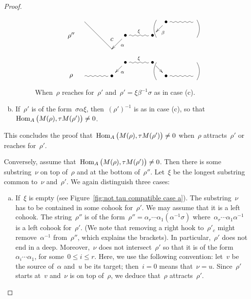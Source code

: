 \documentclass{amsart}
\theoremstyle{definition}
\newcommand{\Hom}[1]{\operatorname{{\rm Hom}}_{#1}}
\begin{document}
\begin{proof}
\begin{enumerate}[(a)]
 \begin{figure}[h]
 	\capstart
\[
\xy
%
(-35,7)*+{\rho''};
(-28,14)="peak";
(-14,5)*+{c};
(-14,0)="-12";
(-7,7)*+{\bullet}="-11";
(7,7)*+{\bullet}="11";
(14,14)*+{\bullet}="12";
(28,14)="14";
%
(-35,-14)*+{\rho};
(-28,-14)="-4";
(-14,-14)*+{\bullet}="-2";
(-7,-7)*+{\bullet}="-1";
(7,-7)*+{\bullet}="1";
(14,-14)*+{\bullet}="2";
(28,-14)="4";
%
{\ar@{-} "peak";"-12"};
{\ar^{\alpha} "-11";"-12"};
{\ar@{~}^\xi "-11";"11"};
{\ar^{\beta} "12";"11"};
{\ar@{~} "12";"14"};
%
{\ar@/^.3pc/@{-} (30,15);(30,6)};
{\ar@/_.3pc/@{-} (9,15);(9,6)};
%
{\ar@/_.3pc/@{-} (30,-16);(30,-7)};
{\ar@/^.3pc/@{-} (9,-16);(9,-7)};
%
{\ar@{~} "-4";"-2"};
{\ar^{\alpha} "-1";"-2"};
{\ar@{~}^\xi "-1";"1"};
{\ar "1";"2"};
{\ar@{~} "2";"4"};
%
\endxy
\]
    \caption{When~$\rho$ reaches for~$\rho'$ and~$\rho'=\xi\beta^{-1}\sigma$ as in case (c).}
    \vspace{-.5cm}
    \label{fig:dance case c}
\end{figure}

\item If~$\rho'$ is of the form~$\sigma\alpha\xi$, then~$(\rho')^{-1}$ is as in case (c), so that~$\Hom{A} \big( M(\rho), \tau M(\rho') \big) \ne 0$.
\end{enumerate}
This concludes the proof that~$\Hom{A} \big( M(\rho), \tau M(\rho') \big) \ne 0$ when~$\rho$ attracts~$\rho'$ or reaches for~$\rho'$.

\bigskip
Conversely, assume that~$\Hom{A} \big( M(\rho), \tau M(\rho') \big) \ne 0$.
Then there is some substring~$\nu$ on top of~$\rho$ and at the bottom of~$\rho''$.
Let~$\xi$ be the longest substring common to~$\nu$ and~$\rho'$.
We again distinguish three cases:

\begin{enumerate}[(a)]
\item If~$\xi$ is empty (see Figure~\ref{fig:not tau compatible case a}).
The substring~$\nu$ has to be contained in some cohook for~$\rho'$.
We may assume that it is a left cohook.
The string~$\rho''$ is of the form~$\rho''= \alpha_r\cdots\alpha_1(\alpha^{-1}\sigma)$ where~$\alpha_r\cdots\alpha_1\alpha^{-1}$ is a left cohook for~$\rho'$.
(We note that removing a right hook to~$\rho'_c$ might remove~$\alpha^{-1}$ from~$\rho''$, which explains the brackets).
In particular,~$\rho'$ does not end in a deep.
Moreover,~$\nu$ does not intersect~$\rho'$ so that it is of the form~$\alpha_i\cdots\alpha_1$, for some~$0\leq i \leq r$.
Here, we use the following convention: let~$v$ be the source of~$\alpha$ and~$u$ be its target; then~$i=0$ means that~$\nu = u$.
Since~$\rho'$ starts at~$v$ and~$\nu$ is on top of~$\rho$, we deduce that~$\rho$ attracts~$\rho'$.


\end{enumerate}
\end{proof}
\end{document}
